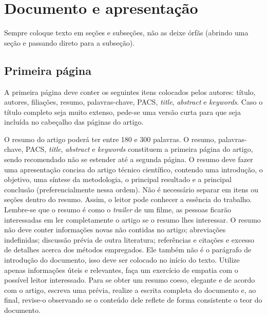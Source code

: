 \documentclass[12pt, a4paper, twoside, twocolumn]{article}
\begin{document}
\section{Documento e apresentação}

Sempre coloque texto em seções e subseções, não as deixe órfãs (abrindo uma seção e passando direto para a subseção).

\subsection{Primeira página}

A primeira página deve conter os seguintes itens colocados pelos autores: título, autores, filiações, resumo, palavras-chave, PACS, \textit{title}, \textit{abstract} e \textit{keywords}. 
%
Caso o título completo seja muito extenso, pede-se uma versão curta para que seja incluída no cabeçalho das páginas do artigo.


O resumo do artigo poderá ter entre 180 e 300 palavras. O resumo, palavras-chave, PACS, \textit{title}, \textit{abstract} e \textit{keywords} constituem a primeira página do artigo, sendo recomendado não se estender até a segunda página.
O resumo deve fazer uma apresentação concisa do artigo técnico científico, contendo uma introdução, o objetivo, uma síntese da metodologia, o principal resultado e a principal conclusão (preferencialmente nessa ordem). Não é necessário separar em itens ou seções dentro do resumo. Assim, o leitor pode conhecer a essência do trabalho. Lembre-se que o resumo é como o \textit{trailer} de um filme, as pessoas ficarão interessadas em ler completamente o artigo se o resumo lhes interessar. O resumo não deve conter informações novas não contidas no artigo; abreviações indefinidas; discussão prévia de outra literatura; referências e citações e excesso de detalhes acerca dos métodos empregados. Ele também não é o parágrafo de introdução do documento, isso deve ser colocado no início do texto. Utilize apenas informações úteis e relevantes, faça um exercício de empatia com o possível leitor interessado. Para se obter um resumo coeso, elegante e de acordo com o artigo, escreva uma prévia, realize a escrita completa do documento e, ao final, revise-o observando se o conteúdo dele reflete de forma consistente o teor do documento. 
\end{document}
